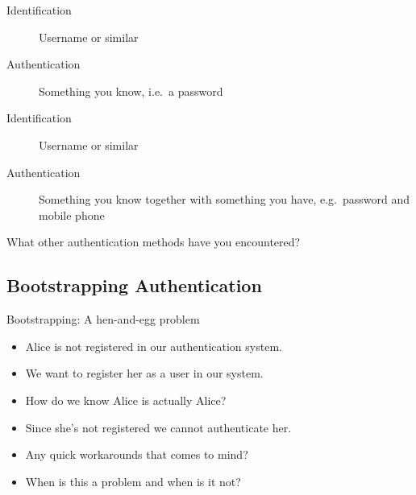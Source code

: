\documentclass{beamer}
\begin{document}
\begin{frame}
  \begin{example}
    \begin{description}
      \item[Identification] Username or similar
      \item[Authentication] Something you know, i.e.\ a password
    \end{description}
  \end{example}

  \pause{}

  \begin{example}
    \begin{description}
      \item[Identification] Username or similar
      \item[Authentication] Something you know together with something you 
        have, e.g.\ password and mobile phone
    \end{description}
  \end{example}
\end{frame}

\begin{frame}
  \begin{exercise}
    What other authentication methods have you encountered?
  \end{exercise}
\end{frame}

\subsection{Bootstrapping Authentication}

\begin{frame}
  \begin{block}{Bootstrapping: A hen-and-egg problem}
    \begin{itemize}
      \item Alice is not registered in our authentication system.
      \item We want to register her as a user in our system.

        \pause{}

      \item How do we know Alice is actually Alice?
      \item Since she's not registered we cannot authenticate her.
    \end{itemize}
  \end{block}

  \pause{}

  \begin{exercise}
    \begin{itemize}
      \item Any quick workarounds that comes to mind?
      \item When is this a problem and when is it not?
    \end{itemize}
  \end{exercise}
\end{frame}
\end{document}
